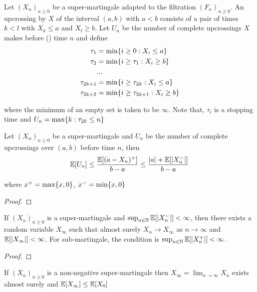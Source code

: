\documentclass{report}
\begin{document}
\begin{definition}[upcrossing]
	Let $(X_n)_{n \geq 0}$ be a super-martingale adapted to the filtration $(F_n)_{n \geq 0}$. An upcrossing by $X$ of the interval $(a, b)$ with $a < b$ consists of a pair of times $k < l$ with $X_k \leq a$ and $X_l \geq b$. Let $U_n$ be the number of complete upcrossings $X$ makes before () time $n$ and define 
	\begin{align*}
		\tau_1 &= \min\{i \geq 0: X_i \leq a\} \\
		\tau_2 &= \min\{i \geq \tau_1: X_i \geq b\} \\
		&... \\
		\tau_{2k + 1} &= \min\{i \geq \tau_{2k}: X_i \leq a\} \\
		\tau_{2k + 2} &= \min\{i \geq \tau_{2k+1}: X_i \geq b\} \\
	\end{align*}
	
	where the minimum of an empty set is taken to be $\infty$.  Note that, $\tau_i$ is a stopping time and $U_n = \max\{k: \tau_{2k} \leq n\}$
\end{definition} 

\begin{lemma}
	Let $(X_n)_{n \geq 0}$ be a super-martingale and $U_n$ be the number of complete upcrossings over $(a, b)$ before time $n$, then
	$$
		\mathbb{E}[U_n] \leq \frac{\mathbb{E}[(a - X_n)^+]}{b-a} \leq \frac{|a| + \mathbb{E}[|X_n^-|]}{b - a}
	$$
	
	where $x^+ = \max\{x, 0\}$, $x^- = \min\{x, 0\}$
\begin{proof}
\end{proof}
\end{lemma}

\begin{theorem}
	If $(X_n)_{n \geq 0}$ is a super-martingale and $\sup_{n \in \mathbb{N}} \mathbb{E}[|X_n^-|] < \infty$, then there exists a random variable $X_\infty$ such that almost surely $X_n \to X_\infty$ as $n \to \infty$ and $\mathbb{E}[|X_\infty|] < \infty$. For sub-martingale, the condition is $\sup_{n \in \mathbb{N}} \mathbb{E}[|X_n^+|] < \infty$.
\begin{proof}
\end{proof}
\end{theorem}

\begin{corollary}
	If $(X_n)_{n \geq 0}$ is a non-negative super-martingale then $X_\infty = \lim_{n \to \infty} X_n$ exists almost surely and $\mathbb{E}[X_\infty] \leq \mathbb{E}[X_0]$
\end{corollary}
\end{document}
